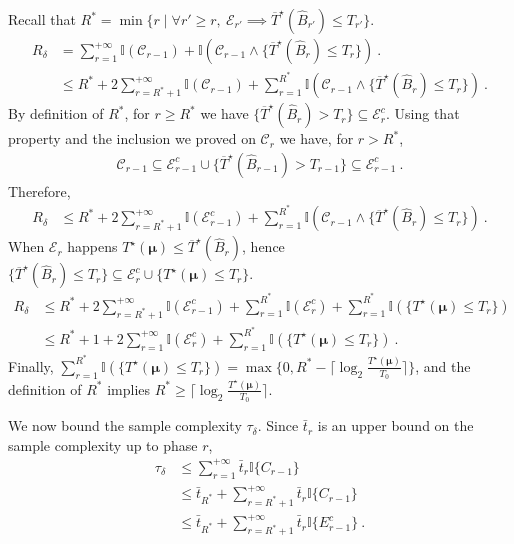 Recall that $R^* = \min \{r \mid \forall r' \ge r, \ \mathcal E_{r'} \implies \overline{T}^\star(\hat{B}_{r'}) \le T_{r'}\}$.
\begin{align*}
R_\delta
&= \sum_{r=1}^{+\infty} \mathbb{I}(\mathcal C_{r-1}) + \mathbb{I}(\mathcal C_{r-1} \wedge \{\overline{T}^\star(\hat{B}_r) \le T_r\}) \: .
\\
&\le R^* + 2 \sum_{r=R^*+1}^{+\infty} \mathbb{I}(\mathcal C_{r-1}) + \sum_{r=1}^{R^*} \mathbb{I}(\mathcal C_{r-1} \wedge \{\overline{T}^\star(\hat{B}_r) \le T_r\})
\: .
\end{align*}
By definition of $R^*$, for $r \ge R^*$ we have $ \{\overline{T}^\star(\hat{B}_r) > T_r\} \subseteq \mathcal E_r^c$.
Using that property and the inclusion we proved on $\mathcal C_r$ we have, for $r > R^*$,
\begin{align*}
\mathcal C_{r-1}
\subseteq \mathcal E_{r-1}^c \cup \{\overline{T}^\star(\hat{B}_{r-1}) > T_{r-1}\}
\subseteq \mathcal E_{r-1}^c
\: .
\end{align*}
Therefore,
\begin{align*}
R_\delta
&\le R^* + 2 \sum_{r=R^*+1}^{+\infty} \mathbb{I}(\mathcal E_{r-1}^c) + \sum_{r=1}^{R^*} \mathbb{I}(\mathcal C_{r-1} \wedge \{\overline{T}^\star(\hat{B}_r) \le T_r\})
\: .
\end{align*}
When $\mathcal E_r$ happens $T^\star(\bm\mu) \le \overline{T}^\star(\hat{B}_r)$, hence $\{\overline{T}^\star(\hat{B}_r) \le T_r\} \subseteq \mathcal E_r^c \cup \{T^\star(\bm\mu) \le T_r\}$.
\begin{align*}
R_\delta
&\le R^* + 2 \sum_{r=R^*+1}^{+\infty} \mathbb{I}(\mathcal E_{r-1}^c) + \sum_{r=1}^{R^*} \mathbb{I}(\mathcal E_{r}^c)
	+ \sum_{r=1}^{R^*} \mathbb{I}(\{T^\star(\bm\mu) \le T_r\})
\\
&\le R^* + 1 + 2 \sum_{r=1}^{+\infty} \mathbb{I}(\mathcal E_{r}^c) + \sum_{r=1}^{R^*} \mathbb{I}(\{T^\star(\bm\mu) \le T_r\})
\: .
\end{align*}
Finally, $ \sum_{r=1}^{R^*} \mathbb{I}(\{T^\star(\bm\mu) \le T_r\}) = \max\{0, R^* - \lceil \log_2 \frac{T^\star(\bm\mu)}{T_0} \rceil \}$, and the definition of $R^*$ implies $R^* \ge \lceil \log_2 \frac{T^\star(\bm\mu)}{T_0} \rceil$.

We now bound the sample complexity $\tau_\delta$. Since $\bar{t}_r$ is an upper bound on the sample complexity up to phase $r$,
\begin{align*}
\tau_\delta
&\le \sum_{r=1}^{+\infty} \bar{t}_r \mathbb{I}\{C_{r-1}\}
\\
&\le \bar{t}_{R^*} + \sum_{r=R^* + 1}^{+\infty} \bar{t}_r \mathbb{I}\{C_{r-1}\}
\\
&\le \bar{t}_{R^*} + \sum_{r=R^* + 1}^{+\infty} \bar{t}_r \mathbb{I}\{E_{r-1}^c\}
\: .
\end{align*}



